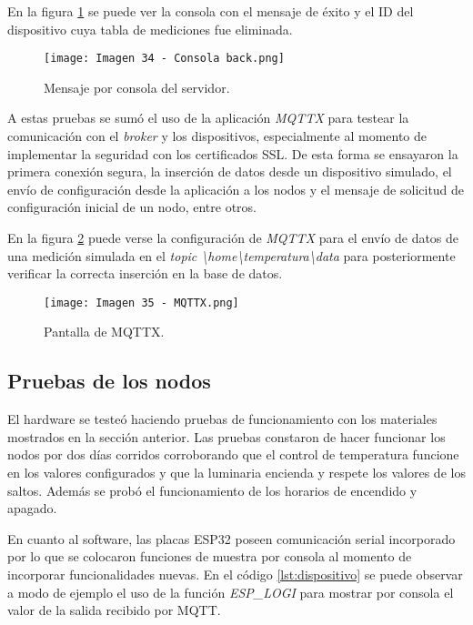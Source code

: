 En la figura \ref{fig:34} se puede ver la consola con el mensaje de éxito y el ID del dispositivo cuya tabla de mediciones fue eliminada.

\begin{figure}[h]
\centering
\texttt{[image: Imagen 34 - Consola back.png]}
\caption[Prueba backend]{Mensaje por consola del servidor.}
\label{fig:34}
\end{figure}

A estas pruebas se sumó el uso de la aplicación \textit{MQTTX} para testear la comunicación con el \textit{broker} y los dispositivos, especialmente al momento de implementar la seguridad con los certificados SSL. De esta forma se ensayaron la primera conexión segura, la inserción de datos desde un dispositivo simulado, el envío de configuración desde la aplicación a los nodos y el mensaje de solicitud de configuración inicial de un nodo, entre otros.

En la figura \ref{fig:35} puede verse la configuración de \textit{MQTTX} para el envío de datos de una medición simulada en el \textit{topic \textbackslash home\textbackslash temperatura\textbackslash data} para posteriormente verificar la correcta inserción en la base de datos.

\begin{figure}[h]
\centering
\texttt{[image: Imagen 35 - MQTTX.png]}
\caption[MQTTX]{Pantalla de MQTTX.}
\label{fig:35}
\end{figure}

\subsection{Pruebas de los nodos}

El hardware se testeó haciendo pruebas de funcionamiento con los materiales mostrados en la sección anterior. Las pruebas constaron de hacer funcionar los nodos por dos días corridos corroborando que el control de temperatura funcione en los valores configurados y que la luminaria encienda y respete los valores de los saltos. Además se probó el funcionamiento de los horarios de encendido y apagado.

En cuanto al software, las placas ESP32 poseen comunicación serial incorporado por lo que se colocaron funciones de muestra por consola al momento de incorporar funcionalidades nuevas. En el código  \ref{lst:dispositivo} se puede observar a modo de ejemplo el uso de la función \textit{ESP\_LOGI} para mostrar por consola el valor de la salida recibido por MQTT.

